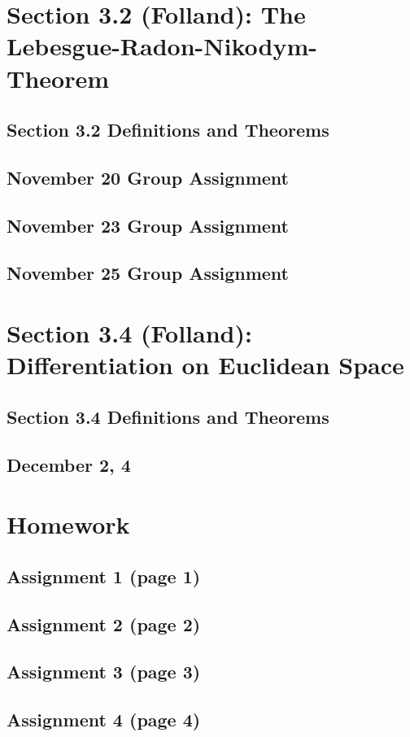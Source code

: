 \documentclass[11pt]{amsart}
\begin{document}
\section{Section 3.2 (Folland): The Lebesgue-Radon-Nikodym-Theorem}

\subsection{Section 3.2 Definitions and Theorems}
  

 \subsection{November 20 Group Assignment}

 
  \subsection{November 23 Group Assignment}
 

  \subsection{November 25 Group Assignment}
  

\section{Section 3.4 (Folland): Differentiation on Euclidean Space}

\subsection{Section 3.4 Definitions and Theorems}
  

 
  \subsection{December 2, 4}
  

\clearpage
 \section{Homework}
  \subsection{Assignment 1 (page 1)}


  \subsection{Assignment 2 (page 2)}
 

  \subsection{Assignment 3 (page 3)}
 

  \subsection{Assignment 4 (page 4)}
  

  
\end{document}

